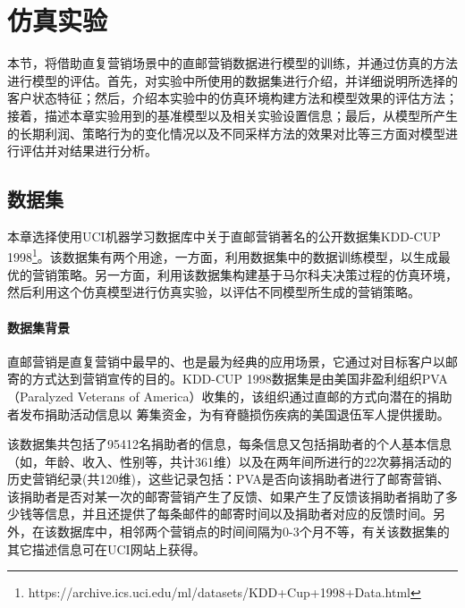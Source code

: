\section{仿真实验}
本节，将借助直复营销场景中的直邮营销数据进行模型的训练，并通过仿真的方法进行模型的评估。首先，对实验中所使用的数据集进行介绍，并详细说明所选择的客户状态特征；然后，介绍本实验中的仿真环境构建方法和模型效果的评估方法；接着，描述本章实验用到的基准模型以及相关实验设置信息；最后，从模型所产生的长期利润、策略行为的变化情况以及不同采样方法的效果对比等三方面对模型进行评估并对结果进行分析。

\subsection{数据集}
本章选择使用UCI机器学习数据库中关于直邮营销著名的公开数据集KDD-CUP 1998\footnote{https://archive.ics.uci.edu/ml/datasets/KDD+Cup+1998+Data.html}。该数据集有两个用途，一方面，利用数据集中的数据训练模型，以生成最优的营销策略。另一方面，利用该数据集构建基于马尔科夫决策过程的仿真环境，然后利用这个仿真模型进行仿真实验，以评估不同模型所生成的营销策略。

\paragraph{数据集背景}
直邮营销是直复营销中最早的、也是最为经典的应用场景，它通过对目标客户以邮寄的方式达到营销宣传的目的。KDD-CUP 1998数据集是由美国非盈利组织PVA（Paralyzed Veterans of America）收集的，该组织通过直邮的方式向潜在的捐助者发布捐助活动信息以
筹集资金，为有脊髓损伤疾病的美国退伍军人提供援助。

该数据集共包括了95412名捐助者的信息，每条信息又包括捐助者的个人基本信息（如，年龄、收入、性别等，共计361维）以及在两年间所进行的22次募捐活动的历史营销纪录(共120维)，这些记录包括：PVA是否向该捐助者进行了邮寄营销、该捐助者是否对某一次的邮寄营销产生了反馈、如果产生了反馈该捐助者捐助了多少钱等信息，并且还提供了每条邮件的邮寄时间以及捐助者对应的反馈时间。另外，在该数据库中，相邻两个营销点的时间间隔为0-3个月不等，有关该数据集的其它描述信息可在UCI网站上获得。

